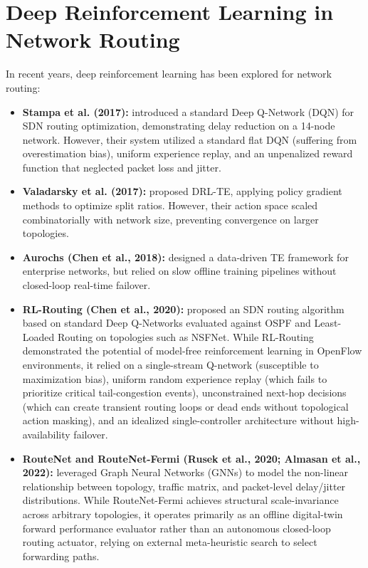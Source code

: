\documentclass[12pt,a4paper,oneside]{report}
\begin{document}
\section{Deep Reinforcement Learning in Network Routing}
In recent years, deep reinforcement learning has been explored for network routing:
\begin{itemize}
    \item \textbf{Stampa et al. (2017):} \cite{stampa2017deep} introduced a standard Deep Q-Network (DQN) for SDN routing optimization, demonstrating delay reduction on a 14-node network. However, their system utilized a standard flat DQN (suffering from overestimation bias), uniform experience replay, and an unpenalized reward function that neglected packet loss and jitter.
    \item \textbf{Valadarsky et al. (2017):} \cite{valadarsky2017learning} proposed DRL-TE, applying policy gradient methods to optimize split ratios. However, their action space scaled combinatorially with network size, preventing convergence on larger topologies.
    \item \textbf{Aurochs (Chen et al., 2018):} \cite{chen2018aurochs} designed a data-driven TE framework for enterprise networks, but relied on slow offline training pipelines without closed-loop real-time failover.
    \item \textbf{RL-Routing (Chen et al., 2020):} \cite{chen2020rlrouting} proposed an SDN routing algorithm based on standard Deep Q-Networks evaluated against OSPF and Least-Loaded Routing on topologies such as NSFNet. While RL-Routing demonstrated the potential of model-free reinforcement learning in OpenFlow environments, it relied on a single-stream Q-network (susceptible to maximization bias), uniform random experience replay (which fails to prioritize critical tail-congestion events), unconstrained next-hop decisions (which can create transient routing loops or dead ends without topological action masking), and an idealized single-controller architecture without high-availability failover.
    \item \textbf{RouteNet and RouteNet-Fermi (Rusek et al., 2020; Almasan et al., 2022):} \cite{rusek2019routenet, almasan2022routenet} leveraged Graph Neural Networks (GNNs) to model the non-linear relationship between topology, traffic matrix, and packet-level delay/jitter distributions. While RouteNet-Fermi achieves structural scale-invariance across arbitrary topologies, it operates primarily as an offline digital-twin forward performance evaluator rather than an autonomous closed-loop routing actuator, relying on external meta-heuristic search to select forwarding paths.

\end{itemize}
\end{document}
